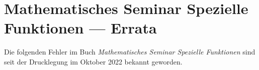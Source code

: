 \documentclass{article}
\begin{document}
\def\fehler#1#2{
\bgroup\parindent0pt
\rule[0mm]{\textwidth}{0.5pt}
\hbox to\hsize{%
#1
\hfill
#2}
\rule[2mm]{\textwidth}{0.5pt}
\egroup
}

\def\korrektur#1{
\vspace{5mm}
\parindent0pt
Korrektur-Diff:\\
\small

}

\section*{Mathematisches Seminar Spezielle Funktionen --- Errata}

Die folgenden Fehler im Buch {\em Mathematisches Seminar Spezielle Funktionen}
sind seit der Drucklegung im Oktober 2022 bekannt geworden.

\vspace*{1cm}


%
\end{document}
